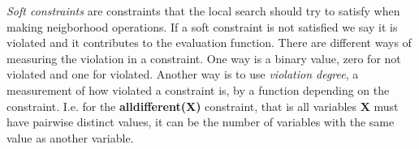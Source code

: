 \emph{Soft constraints} are constraints that the local search should try to satisfy when making neigborhood operations. 
If a soft constraint is not satisfied we say it is violated and it contributes to the evaluation function. There are 
different ways of measuring the violation in a constraint. One way is a binary value, zero for not violated and one 
for violated. Another way is to use \emph{violation degree}, a measurement of how violated a constraint is, by a 
function depending on the constraint. I.e. for the \textbf{alldifferent(X)} constraint, that is all variables \textbf{X} 
must have pairwise distinct values, it can be the number of variables with the same value as another variable. \\ 

